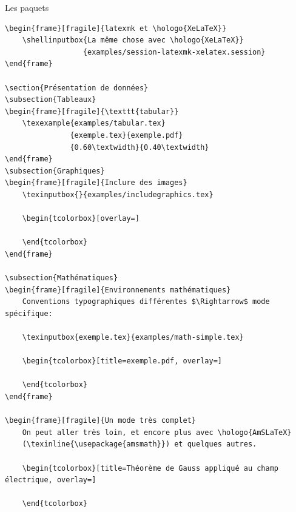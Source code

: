 \documentclass[usenames,dvipsnames]{beamer} %
\newcommand{\texinputbox}[2]{
    \begin{tcolorbox}[title=#1]
        \selectlanguage{english}
        \texinput{#2}
    \end{tcolorbox}
}
\newcommand{\shellinputbox}[2]{
    \begin{tcolorbox}[title=#1,overlay=]
        \selectlanguage{english}
        \shellinput{#2}
    \end{tcolorbox}
}
\newcommand{\texexample}[5]{
    \begin{columns}
        \begin{column}{#4}
            \texinputbox{#2}{#1}
        \end{column}

        \begin{column}{#5}
            \begin{tcolorbox}[title=#3, overlay=]
                
            \end{tcolorbox}
        \end{column}
    \end{columns}
}
\begin{document}
\begin{frame}[fragile]{Les paquets}
\begin{description}
{\begin{verbatim}
\begin{frame}[fragile]{latexmk et \hologo{XeLaTeX}}
    \shellinputbox{La même chose avec \hologo{XeLaTeX}}
                  {examples/session-latexmk-xelatex.session}
\end{frame}

\section{Présentation de données}
\subsection{Tableaux}
\begin{frame}[fragile]{\texttt{tabular}}
    \texexample{examples/tabular.tex}
               {exemple.tex}{exemple.pdf}
               {0.60\textwidth}{0.40\textwidth}
\end{frame}
\subsection{Graphiques}
\begin{frame}[fragile]{Inclure des images}
    \texinputbox{}{examples/includegraphics.tex}

    \begin{tcolorbox}[overlay=]
        
    \end{tcolorbox}
\end{frame}

\subsection{Mathématiques}
\begin{frame}[fragile]{Environnements mathématiques}
    Conventions typographiques différentes $\Rightarrow$ mode spécifique:

    \texinputbox{exemple.tex}{examples/math-simple.tex}

    \begin{tcolorbox}[title=exemple.pdf, overlay=]
        
    \end{tcolorbox}
\end{frame}

\begin{frame}[fragile]{Un mode très complet}
    On peut aller très loin, et encore plus avec \hologo{AmSLaTeX}
    (\texinline{\usepackage{amsmath}}) et quelques autres.

    \begin{tcolorbox}[title=Théorème de Gauss appliqué au champ électrique, overlay=]
        
    \end{tcolorbox}


\end{verbatim}}
\end{description}
\end{frame}
\end{document}
